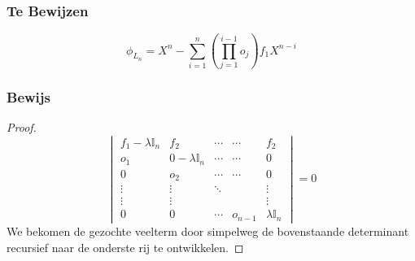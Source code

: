 \documentclass[lineaire_algebra_oplossingen.tex]{subfiles}
\begin{document}
\subsubsection*{Te Bewijzen}
\[
\phi_{L_{n}} =X^{n} -\sum_{i=1}^n \left(\prod_{j=1}^{i-1} o_{j} \right)f_1X^{n-i}
\]

\subsubsection*{Bewijs}
\begin{proof}
\[
\begin{vmatrix}
f_1-\lambda\mathbb{I}_n & f_2 & \cdots & \cdots & f_2\\
o_1 & 0-\lambda\mathbb{I}_n & \cdots & \cdots & 0\\
0 & o_2 & \cdots & \cdots & 0\\
\vdots & \vdots & \ddots & & \vdots\\
\vdots & \vdots & & & \vdots\\
0 & 0 & \cdots & o_{n-1} & \lambda\mathbb{I}_n
\end{vmatrix}
= 0
\]
We bekomen de gezochte veelterm door simpelweg de bovenstaande determinant recursief naar de onderste rij te ontwikkelen.
\end{proof}
\end{document}

